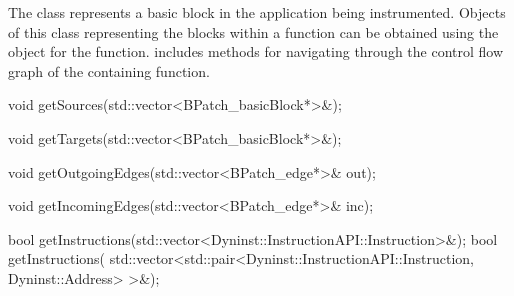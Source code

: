 
The  class represents a basic block in the application being
instrumented. Objects of this class representing the blocks within a function
can be obtained using the  object for the function.
 includes methods for navigating through the control flow
graph of the containing function.

\begin{apient}
  void getSources(std::vector<BPatch_basicBlock*>&);
\end{apient}


\begin{apient}
  void getTargets(std::vector<BPatch_basicBlock*>&);
\end{apient}


\begin{apient}
  void getOutgoingEdges(std::vector<BPatch_edge*>& out);
\end{apient}


\begin{apient}
  void getIncomingEdges(std::vector<BPatch_edge*>& inc);
\end{apient}


\begin{apient}
  bool getInstructions(std::vector<Dyninst::InstructionAPI::Instruction>&);
  bool getInstructions(
      std::vector<std::pair<Dyninst::InstructionAPI::Instruction,
                            Dyninst::Address> >&);
\end{apient}


